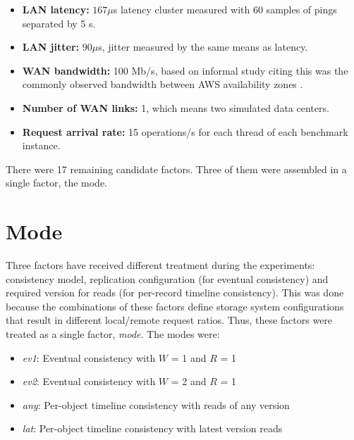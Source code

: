 \documentclass[doublespacing]{bmcart}
\begin{document}
\begin{itemize}
\item \textbf{LAN latency:} $167\mu$s latency cluster measured with 60 samples
of pings separated by 5 s.

\item \textbf{LAN jitter:} $90\mu$s, jitter measured by the same means as
latency.

\item \textbf{WAN bandwidth:} 100 Mb/s, based on informal study citing this was
the commonly observed bandwidth between AWS availability zones
\cite{Pujol2012}.

\item \textbf{Number of WAN links:} 1, which means two simulated data centers.

\item \textbf{Request arrival rate:} 15 operations/s for each thread of each
benchmark instance.

\end{itemize}

There were 17 remaining candidate factors. Three of them were assembled in a
single factor, the mode.

\section{Mode}

Three factors have received different treatment during the experiments: consistency
model, replication configuration (for eventual consistency) and required version for reads (for per-record timeline consistency). This was done because the combinations of
these factors define storage system configurations that result in different
local/remote request ratios. Thus, these factors were treated as a single factor,
\textit{mode}. The modes were:

\begin{itemize}

\item \textit{ev1}: Eventual consistency with $W$ = 1 and $R$ = 1

\item \textit{ev2}: Eventual consistency with $W$ = 2 and $R$ = 1

\item \textit{any}: Per-object timeline consistency with reads of any version

\item \textit{lat}: Per-object timeline consistency with latest version reads

\end{itemize}
\end{document}

